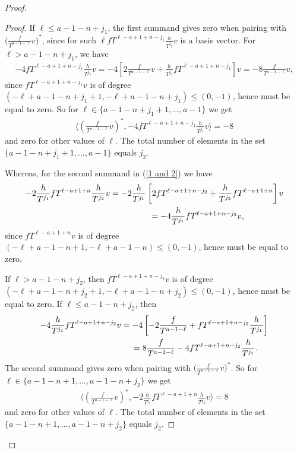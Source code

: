 \documentclass[pdftex]{sigma}
\numberwithin{equation}{section}
\begin{document}
\begin{proof}
\begin{proof}
If $\ell \leq a-1-n+j_1$, the first summand gives zero when pairing with $\big(\frac{f}{T^{a-1-\ell}}v\big)^*$, since for such $\ell fT^{\ell-a+1+n-j_1} \frac{h}{T^{j_2}} v$ is a basis vector. For $\ell > a-1-n+j_1$, we have
\begin{gather*}
-4 fT^{\ell-a+1+n-j_1} \frac{h}{T^{j_2}} v = -4 \left[ 2 \frac{f}{T^{a-1-\ell}} v + \frac{h}{T^{j_2}} fT^{\ell-a+1+n-j_1} \right] v= -8 \frac{f}{T^{a-1-\ell}} v,
\end{gather*}
since $fT^{\ell-a+1+n-j_1}v$ is of degree $(-\ell+a-1-n + j_1 +1, -\ell+a-1-n+j_1) \leq (0, -1)$, hence must be equal to zero. So for $\ell \in \{a-1-n+j_1 +1, \dots, a-1\}$ we get
\begin{gather*}
\bigg\langle \left(\frac{f}{T^{a-1-\ell}}v\right)^*, -4 fT^{\ell-a+1+n-j_1} \frac{h}{T^{j_2}} v \bigg\rangle = -8
\end{gather*}
and zero for other values of $\ell$. The total number of elements in the set $\{a-1-n+j_1 +1, \dots, a-1\}$ equals $j_2$.

Whereas, for the second summand in (\ref{1 and 2}) we have
\begin{gather*}
-2 \frac{h}{T^{j_1}} fT^{\ell-a+1+n} \frac{h}{T^{j_2}} v = -2\frac{h}{T^{j_1}} \left[ 2 fT^{\ell-a+1+n - j_2} + \frac{h}{T^{j_2}} fT^{\ell-a+1+n} \right] v \\
\hphantom{-2 \frac{h}{T^{j_1}} fT^{\ell-a+1+n} \frac{h}{T^{j_2}} v } = -4 \frac{h}{T^{j_1}} fT^{\ell-a+1+n -j_2} v,
\end{gather*}
since $fT^{\ell-a+1+n} v$ is of degree $(-\ell+a-1-n+1, -\ell+a-1-n) \leq (0, -1)$, hence must be equal to zero.

If $\ell > a-1-n+j_2$, then $fT^{\ell-a+1+n-j_2} v$ is of degree $(-\ell+a-1-n+j_2 +1, -\ell+a-1-n+j_2) \leq (0, -1)$, hence must be equal to zero. If $\ell \leq a-1-n+j_2$, then
\begin{gather*}
-4 \frac{h}{T^{j_1}} fT^{\ell-a+1+n -j_2} v = -4 \left[ -2\frac{f}{T^{a-1-\ell}} + fT^{\ell-a+1+n - j_2} \frac{h}{T^{j_1}} \right] \\
\hphantom{-4 \frac{h}{T^{j_1}} fT^{\ell-a+1+n -j_2} v} = 8 \frac{f}{T^{a-1-\ell}} -4 fT^{\ell-a+1+n - j_2} \frac{h}{T^{j_1}}.
\end{gather*}
The second summand gives zero when pairing with $\big(\frac{f}{T^{a-1-\ell}}v\big)^*$. So for $\ell \in \{a-1-n+1, \dots, a-1-n+j_2 \}$ we get
\begin{gather*}
\bigg\langle \left(\frac{f}{T^{a-1-\ell}}v\right)^*, -2 \frac{h}{T^{j_1}} fT^{\ell-a+1+n} \frac{h}{T^{j_2}} v \bigg\rangle = 8
\end{gather*}
and zero for other values of $\ell$. The total number of elements in the set $\{a-1-n+1, \dots, a-1-n+j_2 \}$ equals $j_2$.


\end{proof}
\end{proof}
\end{document}
